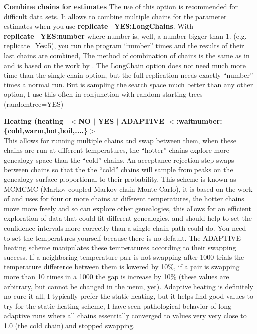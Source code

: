 \begin{description}
\item\textbf{ Combine chains for estimates}
The use of this option is recommended for difficult
data sets. It allows to combine multiple chains for the parameter 
estimates when you use \textbf{ replicate=YES:LongChains}. 
With  \textbf{ replicate=YES:number} where number is, well, 
a number bigger than 1. (e.g. replicate=Yes:5), you run the program ``number'' times and the results of their last chains are combined,
The method of combination of chains is the same as in \cite{kuhner:1995:eep}
and is based on the work by \cite{geyer1991-t}. The LongChain option does not need much more time than the single chain option, but the full replication needs
exactly ``number'' times a normal run. But is sampling the search space
much better than any other option, I use this often in conjunction with
random starting trees (randomtree=YES). 
\item\textbf{ Heating (heating=$<$NO $|$ YES $|$ ADAPTIVE $<$:waitnumber:\{cold,warm,hot,boil,....\}$>$}\\
This allows for running multiple chains and swap between them, when 
these chains are run at different temperatures, 
the ``hotter'' chains explore more genealogy space than the 
``cold'' chains. An acceptance-rejection
step swaps between chains so that the the ``cold'' chains will sample
from peaks on the genealogy surface proportional to their
probability. This scheme is known as MCMCMC (Markov 
coupled Markov chain Monte Carlo),
it is based on the work of \cite{geyer:1995:amc} and uses for
four or more chains at different temperatures, the hotter chains move more freely
and so can explore other genealogies, this allows for an efficient 
exploration of data that could fit different genealogies, and should help
to set the confidence intervals more correctly than a single chain path 
could do. You need to set the temperatures yourself because there is no default.
The ADAPTIVE heating scheme manipulates these temperatures according to their
swapping success. If a neighboring temperature pair is not swapping after 1000 trials
the temperature difference between them is lowered by 10\%, if a pair is swapping more than
10 times in a 1000 the gap is increase by 10\% (these values are arbitrary, but cannot be changed in the menu, yet).
Adaptive heating is definitely no cure-it-all, I typically prefer the static heating, but it helps find good values to try for the static heating scheme, I have seen pathological behavior of long adaptive runs where all chains essentially converged to values very very close to 1.0 (the cold chain) and stopped swapping. 


\end{description}
